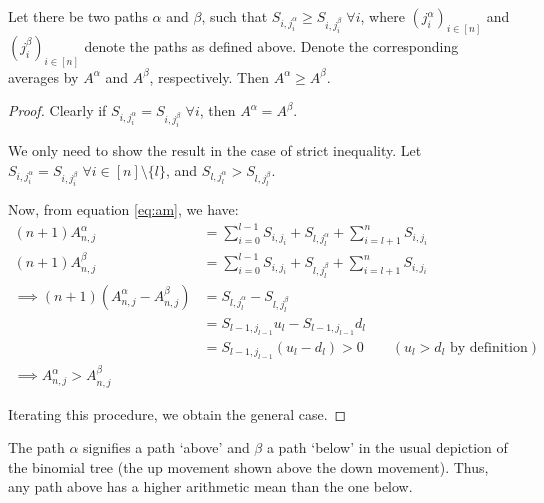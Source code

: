 \begin{thm}
	\label{thm:sp-asian-up-dn-path}
	Let there be two paths $\alpha$ and $\beta$, such that $S_{i,j_i^\alpha} \ge S_{i,j_i^\beta} \; \forall i$, where $ ( j_i^\alpha )_{i \in [n]} $ and $ ( j_i^\beta )_{i \in [n]} $ denote the paths as defined above. Denote the corresponding averages by $A^\alpha$ and $A^\beta$, respectively. Then $ A^\alpha \ge A^\beta $.
\end{thm}

\begin{proof}
	Clearly if $S_{i,j_i^\alpha} = S_{i,j_i^\beta} \; \forall i$, then $A^\alpha = A^\beta$.
	
	We only need to show the result in the case of strict inequality.
	Let $ S_{i,j_i^\alpha} = S_{i,j_i^\beta} \; \forall i \in [n] \setminus \{l\} $, and $ S_{l,j_l^\alpha} > S_{l,j_l^\beta}$.
	
	Now, from equation \ref{eq:am}, we have:
	\begin{align*}
		(n+1) A_{n,j}^\alpha &= \sum_{i=0}^{l-1} S_{i,j_i} + S_{l,j_l^\alpha} + \sum_{i=l+1}^{n} S_{i,j_i} \\
		(n+1) A_{n,j}^\beta &= \sum_{i=0}^{l-1} S_{i,j_i} + S_{l,j_l^\beta} + \sum_{i=l+1}^{n} S_{i,j_i} \\
		\implies (n+1) \left(A_{n,j}^\alpha - A_{n,j}^\beta\right) &= S_{l,j_l^\alpha} - S_{l,j_l^\beta} \\
												 &= S_{l-1,j_{l-1}} u_l - S_{l-1,j_{l-1}} d_l \\
												 &= S_{l-1,j_{l-1}} (u_l - d_l) > 0 \qquad (u_l > d_l \text{ by definition}) \\
		\implies A_{n,j}^\alpha > A_{n,j}^\beta
	\end{align*}
	
	Iterating this procedure, we obtain the general case.
\end{proof}


\begin{rem}
	The path $\alpha$ signifies a path `above' and $\beta$ a path `below' in the usual depiction of the binomial tree (the up movement shown above the down movement). Thus, any path above	 has a higher arithmetic mean than the one below.
\end{rem}


